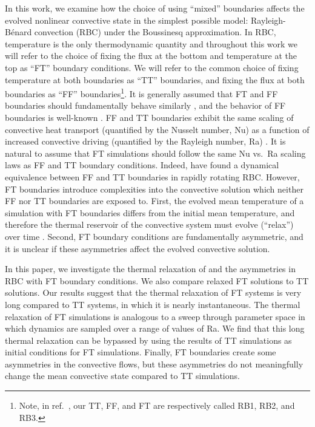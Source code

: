 \documentclass[aps, pre, onecolumn, nofootinbib, notitlepage, groupedaddress, amsfonts, amssymb, amsmath, longbibliography, superscriptaddress]{revtex4-1}
\newcommand{\RB}{Rayleigh-B\'{e}nard }
\newcommand{\ea}[1]{{\color{red} #1}}
\begin{document}
In this work, we examine how the choice of using ``mixed'' boundaries affects the evolved nonlinear convective state in the simplest possible model: \RB convection (RBC) under the Boussinesq approximation.
In RBC, temperature is the only thermodynamic quantity and throughout this work we will refer to the choice of fixing the flux at the bottom and temperature at the top as ``FT'' boundary conditions.
We will refer to the common choice of fixing temperature at both boundaries as ``TT'' boundaries, and fixing the flux at both boundaries as ``FF'' boundaries\footnote{Note, in ref.~\cite{goluskin2016}, our TT, FF, and FT are respectively called RB1, RB2, and RB3.}.
It is generally assumed that FT and FF boundaries should fundamentally behave similarly \cite{goluskin2016}, and the behavior of FF boundaries is well-known \cite{otero&all2002, johnston&doering2009}.
FF and TT boundaries exhibit the same scaling of convective heat transport (quantified by the Nusselt number, Nu) as a function of increased convective driving (quantified by the Rayleigh number, Ra) \cite{johnston&doering2009}.
It is natural to assume that FT simulations should follow the same Nu vs.~Ra scaling laws as FF and TT boundary conditions.
\ea{Indeed, \citet{calkins&all2015} have found a dynamical equivalence between FF and TT boundaries in rapidly rotating RBC.}
However, FT boundaries introduce complexities into the convective solution which neither FF nor TT boundaries are exposed to.
First, the evolved mean temperature of a simulation with FT boundaries differs from the initial mean temperature, and therefore the thermal reservoir of the convective system must evolve (``relax'') over time \cite{anders&all2018}.
Second, FT boundary conditions are fundamentally asymmetric, and it is unclear if these asymmetries affect the evolved convective solution.

In this paper, we investigate the thermal relaxation of and the asymmetries in RBC with FT boundary conditions.
We also compare relaxed FT solutions to TT solutions.
Our results suggest that the thermal relaxation of FT systems is very long compared to TT systems, in which it is nearly instantaneous.
The thermal relaxation of FT simulations is analogous to a sweep through parameter space in which dynamics are sampled over a range of values of Ra.
We find that this long thermal relaxation can be bypassed by using the results of TT simulations as initial conditions for FT simulations.
Finally, FT boundaries create some asymmetries in the convective flows, but these asymmetries do not meaningfully change the mean convective state compared to TT simulations.
\end{document}

